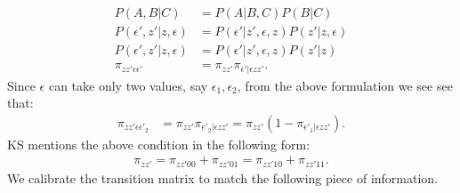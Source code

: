 \documentclass[12pt]{article}
\begin{document}
\begin{align*}
P(A, B|C) & = P(A|B, C) P(B|C)\\
P( \epsilon', z' | z, \epsilon) & = P(\epsilon'|z', \epsilon, z) P(z'| z, \epsilon) \\
P(\epsilon', z' | z, \epsilon) & = P(\epsilon'|z', \epsilon, z) P(z'| z)\\
\pi_{zz'\epsilon\epsilon'} & = \pi_{zz'}\pi_{\epsilon'|\epsilon z z'}.
\end{align*}
Since $\epsilon$ can take only two values, say $\epsilon_1, \epsilon_2$, from the above formulation we see see that:
\begin{align*}
\pi_{zz'\epsilon\epsilon'_2} & = \pi_{zz'}\pi_{\epsilon'_2|\epsilon z z'} = \pi_{zz'}(1-\pi_{\epsilon'_1|\epsilon z z'}).
\end{align*}
KS mentions the above condition in the following form:
\begin{align*}
\pi_{zz'} = \pi_{zz'00} + \pi_{zz'01} = \pi_{zz'10} + \pi_{zz'11}.
\end{align*}
We calibrate the transition matrix to match the following piece of information.
\end{document}
